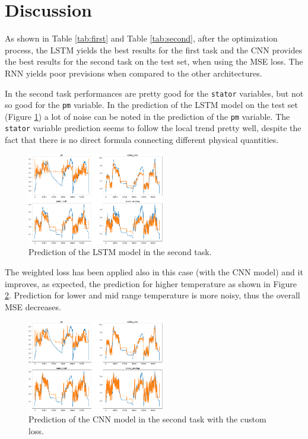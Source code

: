 \section{Discussion}
As shown in Table \ref{tab:first} and Table \ref{tab:second}, after the optimization process, the LSTM yields the best results for the first task and the CNN provides the best results for the second task on the test set, when using the MSE loss.
The RNN yields poor previsions when compared to the other architectures.

In the second task performances are pretty good for the \verb|stator| variables, but not so good for the \verb|pm| variable. %
In the prediction of the LSTM model on the test set (Figure \ref{fig:lstm_second}) a lot of noise can be noted in the prediction of the \verb|pm| variable.
The \verb|stator| variable prediction seems to follow the local trend pretty well, despite the fact that there is no direct formula connecting different physical quantities.
\begin{figure}[!h]
    \centering
    \includegraphics[width=\linewidth, height=4cm]{imgs/lstm_pred_second.png}
    \caption{Prediction of the LSTM model in the second task.}
    \label{fig:lstm_second}
\end{figure}

The weighted loss has been applied also in this case (with the CNN model) and it improves, as expected, the prediction for higher temperature as shown in Figure \ref{fig:cnn_second}. Prediction for lower and mid range temperature is more noisy, thus the overall MSE decreases.
\begin{figure}[!h]
    \centering
    \includegraphics[width=\linewidth, height=4cm]{imgs/pred_second_custom_loss.png}
    \caption{Prediction of the CNN model in the second task with the custom loss.}
    \label{fig:cnn_second}
\end{figure}

